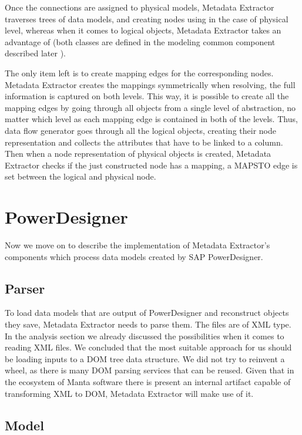 Once the connections are assigned to physical models, Metadata Extractor traverses trees of data models, and creating nodes using  in the case of physical level, whereas when it comes to logical objects, Metadata Extractor takes an advantage of  (both classes are defined in the modeling common component described later ).

The only item left is to create mapping edges for the corresponding nodes.
Metadata Extractor creates the mappings symmetrically when resolving, the full information is captured on both levels. 
This way, it is possible to create all the mapping edges by going through all objects from a single level of abstraction, no matter which level as each mapping edge is contained in both of the levels.
Thus, data flow generator goes through all the logical objects, creating their node representation and collects the attributes that have to be linked to a column.
Then when a node representation of physical objects is created, Metadata Extractor checks if the just constructed node has a mapping, a MAPS\textunderscore TO edge is set between the logical and physical node.

\section{PowerDesigner}

Now we move on to describe the implementation of Metadata Extractor's components which process data models created by SAP PowerDesigner.

\subsection{Parser}

To load data models that are output of PowerDesigner and reconstruct objects they save, Metadata Extractor needs to parse them. The files are of XML type.
In the analysis section we already discussed the possibilities when it comes to reading XML files. We concluded that the most suitable approach for us should be loading inputs to a DOM tree data structure.
We did not try to reinvent a wheel, as there is many DOM parsing services that can be reused. 
Given that in the ecosystem of Manta software there is present an internal artifact capable of transforming XML to DOM, Metadata Extractor will make use of it.

\subsection{Model}

